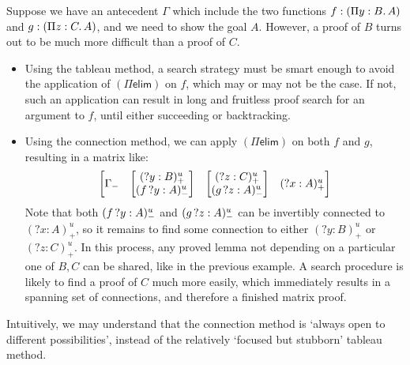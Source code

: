 \documentclass[twoside]{report}
\begin{document}
\begin{example}
Suppose we have an antecedent $\Gamma$ which include the two functions $f : (\Pi{y} : {B}.\,{A})$ and $g : (\Pi{z} : {C}.\,{A})$, and we need to show the goal $A$. However, a proof of $B$ turns out to be much more difficult than a proof of $C$.

\begin{itemize}
    \item Using the tableau method, a search strategy must be smart enough to avoid the application of $(\Pi\mathsf{elim})$ on $f$, which may or may not be the case. If not, such an application can result in long and fruitless proof search for an argument to $f$, until either succeeding or backtracking.

    \item Using the connection method, we can apply $(\Pi\mathsf{elim})$ on both $f$ and $g$, resulting in a matrix like:
    $$
    \begin{bmatrix}\Gamma_- & \begin{bmatrix}({?y} : B)^u_+ \\ ({f}\,{?y} : A)^u_-\end{bmatrix} & \begin{bmatrix}({?z} : C)^u_+ \\ ({g}\,{?z} : A)^u_-\end{bmatrix} & ({?x} : A)^u_+\end{bmatrix}
    $$
    Note that both $({f}\,{?y} : A)^u_-$ and $({g}\,{?z} : A)^u_-$ can be invertibly connected to $({?x} : A)^u_+$, so it remains to find some connection to either $({?y} : B)^u_+$ or $({?z} : C)^u_+$. In this process, any proved lemma not depending on a particular one of $B, C$ can be shared, like in the previous example. A search procedure is likely to find a proof of $C$ much more easily, which immediately results in a spanning set of connections, and therefore a finished matrix proof. 
\end{itemize}

Intuitively, we may understand that the connection method is `always open to different possibilities', instead of the relatively `focused but stubborn' tableau method.
\end{example}
\end{document}
